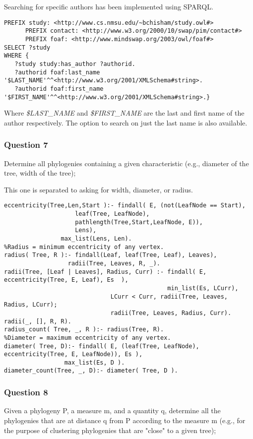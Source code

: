 \documentclass[10pt]{article}
\begin{document}
Searching for specific authors has been implemented using SPARQL.

\begin{verbatim}
PREFIX study: <http://www.cs.nmsu.edu/~bchisham/study.owl#>
      PREFIX contact: <http://www.w3.org/2000/10/swap/pim/contact#>
      PREFIX foaf: <http://www.mindswap.org/2003/owl/foaf#>
SELECT ?study
WHERE {
   ?study study:has_author ?authorid.
   ?authorid foaf:last_name '$LAST_NAME'^^<http://www.w3.org/2001/XMLSchema#string>.
   ?authorid foaf:first_name '$FIRST_NAME'^^<http://www.w3.org/2001/XMLSchema#string>.}
\end{verbatim}

Where \emph{\$LAST\_NAME} and \emph{\$FIRST\_NAME} are the last and first name
of the author respectively.  The option to search on just the last name is also
available.

\subsubsection{Question 7}
Determine all phylogenies containing a given characteristic (e.g., diameter of the tree, width of the tree);

This one is separated to asking for width, diameter, or radius.
\begin{verbatim}
eccentricity(Tree,Len,Start ):- findall( E, (not(LeafNode == Start),
					leaf(Tree, LeafNode), 
					pathlength(Tree,Start,LeafNode, E)), 
					Lens),
				max_list(Lens, Len).
%Radius = minimum eccentricity of any vertex.
radius( Tree, R ):- findall(Leaf, leaf(Tree, Leaf), Leaves),
	       	      radii(Tree, Leaves, R, _).
radii(Tree, [Leaf | Leaves], Radius, Curr) :- findall( E, eccentricity(Tree, E, Leaf), Es  ),
	                           		          min_list(Es, LCurr),
					          LCurr < Curr, radii(Tree, Leaves, Radius, LCurr);
					          radii(Tree, Leaves, Radius, Curr).
radii(_, [], R, R).
radius_count( Tree, _, R ):- radius(Tree, R).
%Diameter = maximum eccentricity of any vertex.
diameter( Tree, D):- findall( E, (leaf(Tree, LeafNode), eccentricity(Tree, E, LeafNode)), Es ), 
		         max_list(Es, D ).
diameter_count(Tree, _, D):- diameter( Tree, D ).
\end{verbatim}

\subsubsection{Question 8}
Given a phylogeny P, a measure m, and a quantity q, determine all the
phylogenies that are at distance q from P according to the measure m (e.g., for
the purpose of clustering phylogenies that are "close" to a given tree);
\end{document}
